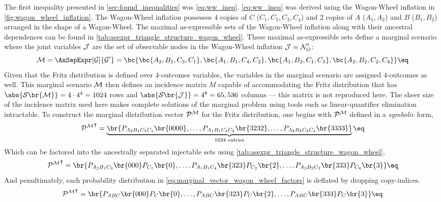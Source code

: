 \documentclass[aps, 10pt, english, twoside, pra, nofootinbib, tightenlines, longbibliography, superscriptaddress]{revtex4-1}
\renewcommand{\Events}[1]{\mathcal{S}\br{#1}} %
\begin{document}
    The first inequality presented in \cref{sec:found_inequalities} was \cref{eq:ww_ineq}. \cref{eq:ww_ineq} was derived using the Wagon-Wheel inflation in \cref{fig:wagon_wheel_inflation}. The Wagon-Wheel inflation possesses $4$ copies of $C$ ($C_1, C_2, C_3, C_4$) and $2$ copies of $A$ ($A_1, A_2$) and $B$ ($B_1, B_2$) arranged in the shape of a Wagon-Wheel. The maximal as-expressible sets of the Wagon-Wheel inflation along with their ancestral dependences can be found in \cref{tab:asexpr_triangle_structure_wagon_wheel}. These maximal as-expressible sets define a marginal scenario where the joint variables $\mathcal{J}$ are the set of observable nodes in the Wagon-Wheel inflation $\mathcal{J} = \mathcal{N}'_O$:
    \[ \mscenario = \AnSepExpr[\graph]{\graph'} = \bc{\bc{A_2, B_1, C_3, C_1}, \bc{A_1, B_1, C_4, C_2}, \bc{A_1, B_2, C_1, C_3}, \bc{A_2, B_2, C_2, C_4}} \eq \label{eq:wagon_wheel_marginal_model}\]
    Given that the Fritz distribution is defined over $4$-outcomes variables, the variables in the marginal scenario are assigned $4$-outcomes as well. This marginal scenario $\mathcal{M}$ then defines an incidence matrix $M$ capable of accommodating the Fritz distribution that has $\abs{\Events{\mscenario}} = 4 \cdot 4^{4} = 1024$ rows and $\abs{\Events{\jointvar}} = 4^8 = 65,536$ columns --- this matrix is not reproduced here. The sheer size of the incidence matrix used here makes complete solutions of the marginal problem using tools such as linear-quantifier elimination intractable. To construct the marginal distribution vector $\probvec^{\mscenario}$ for the Fritz distribution, one begins with $\probvec^{\mscenario}$ defined in a \textit{symbolic} form,
    \[ {\probvec^{\mscenario}}^{\intercal} = \underbrace{\br{\prob[A_2B_1C_3C_1]\br{0000}, \ldots, \prob[A_1B_1C_4C_2]\br{3232}, \ldots, \prob[A_2B_2C_2C_4]\br{3333}}}_{1024 \text{ entries}} \eq \label{eq:marginal_vector_wagon_wheel} \]
    Which can be factored into the ancestrally separated injectable sets using \cref{tab:asexpr_triangle_structure_wagon_wheel},
    \[ {\probvec^{\mscenario}}^{\intercal} = \br{\prob[A_2B_1C_3]\br{000}\prob[C_1]\br{0}, \ldots, \prob[A_1B_1C_4]\br{323}\prob[C_2]\br{2}, \ldots, \prob[A_2B_2C_2]\br{333}\prob[C_4]\br{3}} \eq \label{eq:marginal_vector_wagon_wheel_factors}\]
    And penultimately, each probability distribution in \cref{eq:marginal_vector_wagon_wheel_factors} is deflated by dropping copy-indices.
    \[ {\probvec^{\mscenario}}^{\intercal} = \br{\prob[ABC]\br{000}\prob[C]\br{0}, \ldots, \prob[ABC]\br{323}\prob[C]\br{2}, \ldots, \prob[ABC]\br{333}\prob[C]\br{3}} \eq \label{eq:marginal_vector_wagon_wheel_factors_dropped}\]
\end{document}
